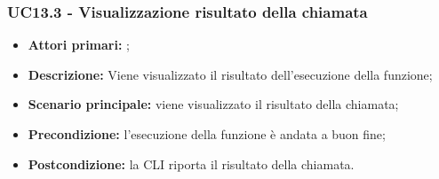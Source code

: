 \subsubsection{UC13.3 - Visualizzazione risultato della chiamata}
\begin{itemize}
	\item \textbf{Attori primari:} \ua{};
	\item \textbf{Descrizione:} Viene visualizzato il risultato dell'esecuzione della funzione; 
	\item \textbf{Scenario principale:} viene visualizzato il risultato della chiamata;
	\item \textbf{Precondizione:} l’esecuzione della funzione è andata a buon fine; 
	\item \textbf{Postcondizione:} la CLI riporta il risultato della chiamata.  
\end{itemize}